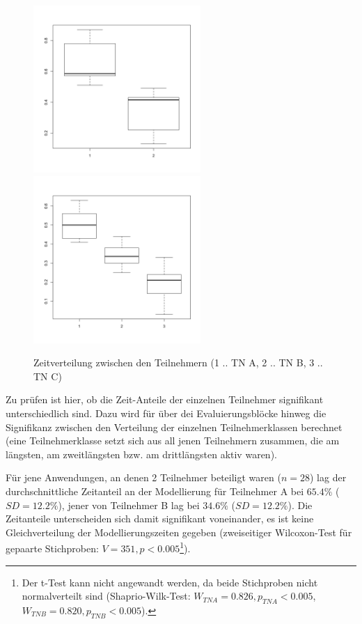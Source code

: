 \begin{figure}[htbp]
	\centering
		\includegraphics[height=2.5in]{img/Evaluierung/timeDist2TN.png}
		\includegraphics[height=2.5in]{img/Evaluierung/timeDist3TN.png}
	\caption[Zeitverteilung zwischen den Teilnehmern]{Zeitverteilung zwischen den Teilnehmern (1 .. TN A, 2 .. TN B, 3 .. TN C)}
	\label{fig:img_Evaluierung_timeDist}
\end{figure}

Zu prüfen ist hier, ob die Zeit-Anteile der einzelnen Teilnehmer signifikant unterschiedlich sind. Dazu wird für über dei Evaluierungsblöcke hinweg die Signifikanz zwischen den Verteilung der einzelnen Teilnehmerklassen berechnet (eine Teilnehmerklasse setzt sich aus all jenen Teilnehmern zusammen, die am längsten, am zweitlängsten bzw. am drittlängsten aktiv waren).

Für jene Anwendungen, an denen 2 Teilnehmer beteiligt waren ($n=28$) lag der durchschnittliche Zeitanteil an der Modellierung für Teilnehmer A bei $65.4\%$ ($SD=12.2\%$), jener von Teilnehmer B lag bei $34.6\%$ ($SD=12.2\%$). Die Zeitanteile unterscheiden sich damit signifikant voneinander, es ist keine Gleichverteilung der Modellierungszeiten gegeben (zweiseitiger Wilcoxon-Test für gepaarte Stichproben: $V=351, p<0.005$\footnote{Der t-Test kann nicht angewandt werden, da beide Stichproben nicht normalverteilt sind (Shaprio-Wilk-Test: $W_{TN A}=0.826, p_{TN A}<0.005$, $W_{TN B}=0.820, p_{TN B}<0.005$).}).

